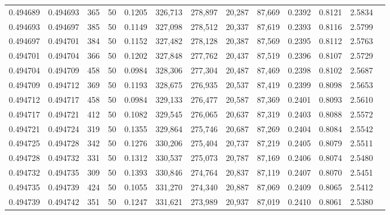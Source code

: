 \begin{tabular}{rrrrrrrrrrrrr}
0.494689 & 0.494693 &   365 &  50 &                                     0.1205 & 326,713 & 278,897 &  20,287 &  87,669 & 0.2392 & 0.8121 & 2.5834 \\
0.494693 & 0.494697 &   385 &  50 &                                     0.1149 & 327,098 & 278,512 &  20,337 &  87,619 & 0.2393 & 0.8116 & 2.5799 \\
0.494697 & 0.494701 &   384 &  50 &                                     0.1152 & 327,482 & 278,128 &  20,387 &  87,569 & 0.2395 & 0.8112 & 2.5763 \\
0.494701 & 0.494704 &   366 &  50 &                                     0.1202 & 327,848 & 277,762 &  20,437 &  87,519 & 0.2396 & 0.8107 & 2.5729 \\
0.494704 & 0.494709 &   458 &  50 &                                     0.0984 & 328,306 & 277,304 &  20,487 &  87,469 & 0.2398 & 0.8102 & 2.5687 \\
0.494709 & 0.494712 &   369 &  50 &                                     0.1193 & 328,675 & 276,935 &  20,537 &  87,419 & 0.2399 & 0.8098 & 2.5653 \\
0.494712 & 0.494717 &   458 &  50 &                                     0.0984 & 329,133 & 276,477 &  20,587 &  87,369 & 0.2401 & 0.8093 & 2.5610 \\
0.494717 & 0.494721 &   412 &  50 &                                     0.1082 & 329,545 & 276,065 &  20,637 &  87,319 & 0.2403 & 0.8088 & 2.5572 \\
0.494721 & 0.494724 &   319 &  50 &                                     0.1355 & 329,864 & 275,746 &  20,687 &  87,269 & 0.2404 & 0.8084 & 2.5542 \\
0.494725 & 0.494728 &   342 &  50 &                                     0.1276 & 330,206 & 275,404 &  20,737 &  87,219 & 0.2405 & 0.8079 & 2.5511 \\
0.494728 & 0.494732 &   331 &  50 &                                     0.1312 & 330,537 & 275,073 &  20,787 &  87,169 & 0.2406 & 0.8074 & 2.5480 \\
0.494732 & 0.494735 &   309 &  50 &                                     0.1393 & 330,846 & 274,764 &  20,837 &  87,119 & 0.2407 & 0.8070 & 2.5451 \\
0.494735 & 0.494739 &   424 &  50 &                                     0.1055 & 331,270 & 274,340 &  20,887 &  87,069 & 0.2409 & 0.8065 & 2.5412 \\
0.494739 & 0.494742 &   351 &  50 &                                     0.1247 & 331,621 & 273,989 &  20,937 &  87,019 & 0.2410 & 0.8061 & 2.5380 \\

\end{tabular}
